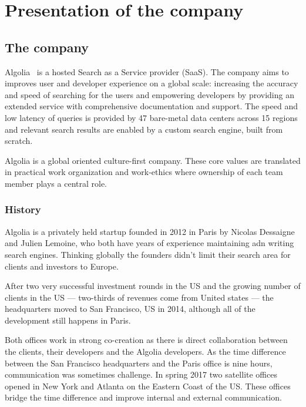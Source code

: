 
\chapter{Presentation of the company} %
\label{chp:presentation}

\section{The company} %
\label{sec:company}

Algolia~\cite{algolia-home} is a hosted Search as a Service provider (SaaS). The company aims to improves user and developer experience on a global scale: increasing the accuracy and speed of searching for the users and empowering developers by providing an extended service with comprehensive documentation and support. The speed and low latency of queries is provided by 47 bare-metal data centers across 15 regions and relevant search results are enabled by a custom search engine, built from scratch.

Algolia is a global oriented culture-first company. These core values are translated in practical work organization and work-ethics where ownership of each team member plays a central role.

\subsection{History}
\label{sub:history}

Algolia is a privately held startup founded in 2012 in Paris by Nicolas Dessaigne and Julien Lemoine, who both have years of experience maintaining adn writing search engines. Thinking globally the founders didn't limit their search area for clients and investors to Europe.

After two very successful investment rounds in the US and the growing number of clients in the US --- two-thirds of revenues come from United states \cite{less-mis} --- the headquarters moved to San Francisco, US in 2014, although all of the development still happens in Paris. 

Both offices work in strong co-creation as there is direct collaboration between the clients, their developers and the Algolia developers. As the time difference between the San Francisco headquarters and the Paris office is nine hours, communication was sometimes challenge. In spring 2017 two satellite offices opened in New York and Atlanta on the Eastern Coast of the US. These offices bridge the time difference and improve internal and external communication.

